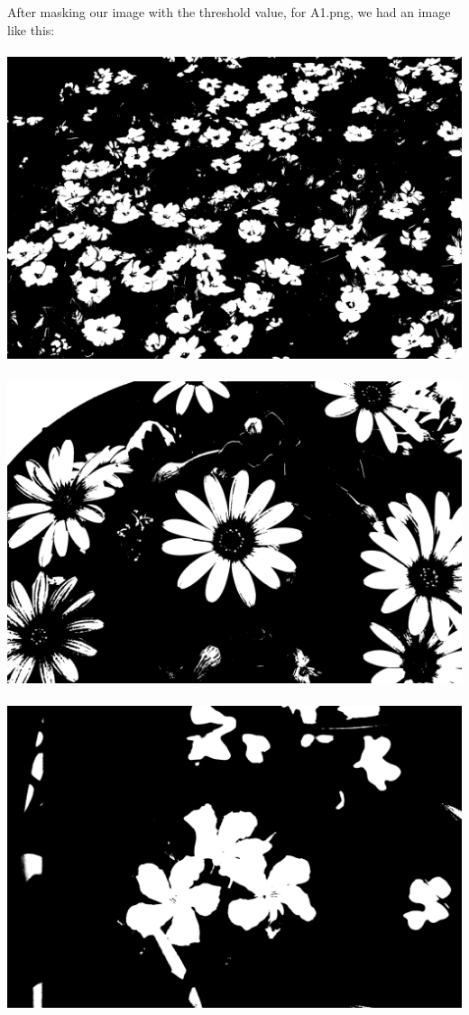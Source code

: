 \documentclass[conference]{IEEEtran}
\begin{document}
After masking our image with the threshold value, for A1.png, we had an image like this: \\ \\
\includegraphics[scale=0.04]{A1_thresh.png} \\ \\
\includegraphics[scale=0.04]{A2_thresh.png} \\ \\
\includegraphics[scale=0.04]{A3_thresh.png} \\ \\
\end{document}
